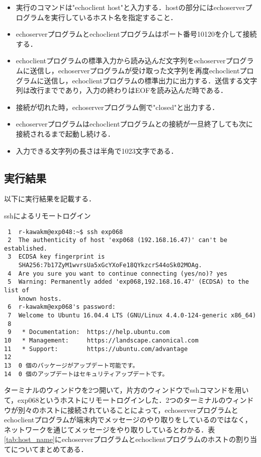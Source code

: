 \documentclass[a4j]{jarticle}
\newenvironment{ite}{\begin{itemize}}{\end{itemize}} %
\newenvironment{bit}{\begin{breakitembox}}{\end{breakitembox}} %
\newcommand{\esp}{echoserverプログラム}
\newcommand{\ecp}{echoclientプログラム}
\begin{document}
\begin{ite}
\item 実行のコマンドは"echoclient host"と入力する．hostの部分には\esp を実行しているホスト名を指定すること．
\item \esp と\ecp はポート番号10120を介して接続する．
\item \ecp の標準入力から読み込んだ文字列を\esp に送信し，\esp が受け取った文字列を再度\ecp に送信し，\ecp の標準出力に出力する．送信する文字列は改行までであり，入力の終わりはEOFを読み込んだ時である．
\item 接続が切れた時，\esp 側で"closed"と出力する．
\item \esp は\ecp との接続が一旦終了しても次に接続されるまで起動し続ける．
\item 入力できる文字列の長さは半角で1023文字である．
\end{ite}

\subsection{実行結果}
\label{sec:ssh}

以下に実行結果を記載する．

\begin{bit}[l]{sshによるリモートログイン}
\begin{verbatim}
 1	r-kawakm@exp048:~$ ssh exp068
 2	The authenticity of host 'exp068 (192.168.16.47)' can't be established.
 3	ECDSA key fingerprint is
    SHA256:7b17ZyM1wvrsUa5xGcYXoFe18QYkzcrS44oSk02MOAg.
 4	Are you sure you want to continue connecting (yes/no)? yes
 5	Warning: Permanently added 'exp068,192.168.16.47' (ECDSA) to the list of
    known hosts.
 6	r-kawakm@exp068's password:
 7	Welcome to Ubuntu 16.04.4 LTS (GNU/Linux 4.4.0-124-generic x86_64)
 8
 9	 * Documentation:  https://help.ubuntu.com
10	 * Management:     https://landscape.canonical.com
11	 * Support:        https://ubuntu.com/advantage
12
13	0 個のパッケージがアップデート可能です。
14	0 個のアップデートはセキュリティアップデートです。
\end{verbatim}
\end{bit}

ターミナルのウィンドウを2つ開いて，片方のウィンドウでsshコマンドを用いて，exp068というホストにリモートログインした．2つのターミナルのウィンドウが別々のホストに接続されていることによって，\esp と\ecp が端末内でメッセージのやり取りをしているのではなく，ネットワークを通じてメッセージをやり取りしているとわかる．表\ref{tab:host_name}に\esp と\ecp のホストの割り当てについてまとめてある．
\end{document}
